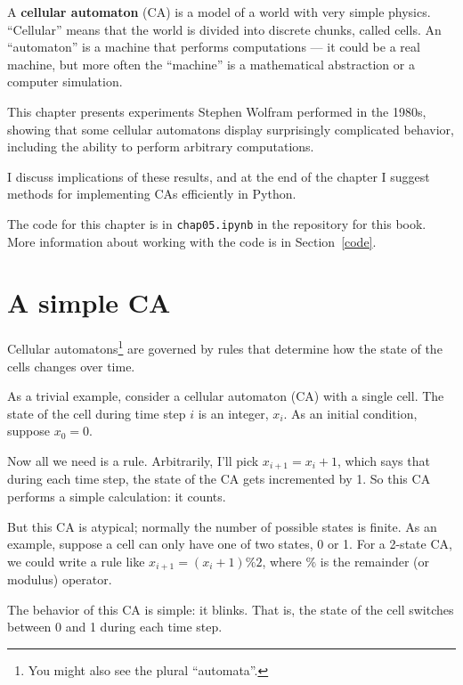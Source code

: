 \documentclass[12pt]{book}
\theoremstyle{exercise}
\begin{document}
A {\bf cellular automaton} (CA) is a model of a world with very simple
physics.  ``Cellular'' means that the world is divided into discrete
chunks, called cells.  An ``automaton'' is a machine that performs
computations --- it could be a real machine, but more often the
``machine'' is a mathematical abstraction or a computer simulation.


This chapter presents experiments Stephen Wolfram performed
in the 1980s, showing that some cellular automatons display
surprisingly complicated behavior, including the ability to
perform arbitrary computations.


I discuss implications of these results, and at the end of the
chapter I suggest methods for implementing CAs efficiently in Python.

The code for this chapter is in {\tt chap05.ipynb} in the repository
for this book.  More information about working with the code is
in Section~\ref{code}.


\section{A simple CA}

Cellular automatons\footnote{You might also see the plural
  ``automata''.} are governed by rules that determine how the state of
the cells changes over time.


As a trivial example, consider a cellular automaton (CA) with
a single cell.  The state of the cell during time step $i$ is an integer, $x_i$.  As an initial condition, suppose $x_0 = 0$.


Now all we need is a rule.  Arbitrarily, I'll pick $x_{i+1} = x_{i} + 1$,
which says that during each time step, the state of the CA gets
incremented by 1.  So this CA performs a simple calculation: it counts.


But this CA is atypical; normally the number of
possible states is finite.  As an example, suppose a cell can only have one of two states, 0 or 1.  For a 2-state CA, we could write a rule like
$x_{i+1} = (x_{i} + 1) \% 2$, where $\%$ is the remainder (or
modulus) operator.

The behavior of this CA is simple: it blinks.  That is,
the state of the cell switches between 0 and 1 during each time step.
\end{document}
